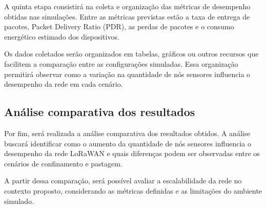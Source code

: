 A quinta etapa consistirá na coleta e organização das métricas de desempenho obtidas nas simulações. Entre as métricas previstas estão a taxa de entrega de pacotes, Packet Delivery Ratio (PDR), as perdas de pacotes e o consumo energético estimado dos dispositivos.

Os dados coletados serão organizados em tabelas, gráficos ou outros recursos que facilitem a comparação entre as configurações simuladas. Essa organização permitirá observar como a variação na quantidade de nós sensores influencia o desempenho da rede em cada cenário.

\subsection{Análise comparativa dos resultados}
\label{subsec:analise-resultados}

Por fim, será realizada a análise comparativa dos resultados obtidos. A análise buscará identificar como o aumento da quantidade de nós sensores influencia o desempenho da rede LoRaWAN e quais diferenças podem ser observadas entre os cenários de confinamento e pastagem.

A partir dessa comparação, será possível avaliar a escalabilidade da rede no contexto proposto, considerando as métricas definidas e as limitações do ambiente simulado.
